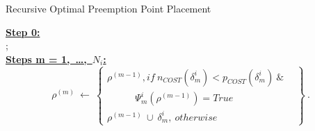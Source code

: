 \begin{algorithm}
\caption{Recursive Optimal Preemption Point Placement}
\label{alg:recursive-optimal-ppp}
\begin{algorithmic}[0]
\State \textbf{\underline{Step 0:}}
\\
;
\\
\State \textbf{\underline{Steps m = 1,\ \ldots,\ $N_{i}$:}}
\begin{equation*}
\rho^{(m)}\ \gets\
\left\{
\begin{array}{l}
    \rho^{(m-1)}, if\ n_{COST}(\delta_{m}^{i}) < p_{COST}(\delta_{m}^{i})\ \&\ \ \ \ \\
    \ \ \ \ \ \ \ \ \ \ \ \ \ \Psi_{m}^{i}(\rho^{(m-1)}) = True\\
    \rho^{(m-1)}\ \cup\ \delta_{m}^{i},\ otherwise
\end{array}
\right\}~.
\end{equation*}
\end{algorithmic}
\end{algorithm}

